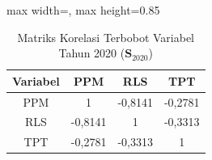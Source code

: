 \begin{table}[H]
\centering
\caption{Matriks Korelasi Terbobot Variabel Tahun 2020 ($\mathbf{S}_{2020}$)} \label{tab:sample2matriks_intra_loading_2020}
\begin{adjustbox}{max width=\textwidth, max height=0.85\textheight}
\begin{tabular}{|c|c|c|c|}
\hline
\textbf{Variabel} & \textbf{PPM} & \textbf{RLS} & \textbf{TPT} \\
\hline
PPM & 1 & -0,8141 & -0,2781 \\
RLS & -0,8141 & 1 & -0,3313 \\
TPT & -0,2781 & -0,3313 & 1 \\
\hline
\end{tabular}
\end{adjustbox}
\end{table}